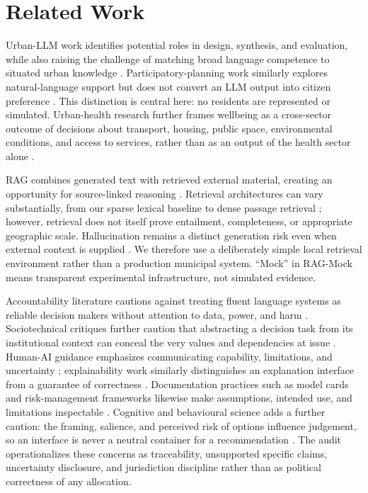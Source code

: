 \documentclass[sigconf,anonymous]{acmart}
\begin{document}
\section{Related Work}
Urban-LLM work identifies potential roles in design, synthesis, and evaluation, while also raising the challenge of matching broad language competence to situated urban knowledge \cite{zheng2025urban}. Participatory-planning work similarly explores natural-language support but does not convert an LLM output into citizen preference \cite{zhou2024participatory}. This distinction is central here: no residents are represented or simulated. Urban-health research further frames wellbeing as a cross-sector outcome of decisions about transport, housing, public space, environmental conditions, and access to services, rather than as an output of the health sector alone \cite{who2016urban,who2023urbangovernance}.

RAG combines generated text with retrieved external material, creating an opportunity for source-linked reasoning \cite{lewis2020rag}. Retrieval architectures can vary substantially, from our sparse lexical baseline to dense passage retrieval \cite{karpukhin2020dpr}; however, retrieval does not itself prove entailment, completeness, or appropriate geographic scale. Hallucination remains a distinct generation risk even when external context is supplied \cite{ji2023hallucination}. We therefore use a deliberately simple local retrieval environment rather than a production municipal system. ``Mock'' in RAG-Mock means transparent experimental infrastructure, not simulated evidence.

Accountability literature cautions against treating fluent language systems as reliable decision makers without attention to data, power, and harm \cite{bender2021stochastic,raji2020closing}. Sociotechnical critiques further caution that abstracting a decision task from its institutional context can conceal the very values and dependencies at issue \cite{selbst2019fairness}. Human-AI guidance emphasizes communicating capability, limitations, and uncertainty \cite{amershi2019guidelines}; explainability work similarly distinguishes an explanation interface from a guarantee of correctness \cite{gunning2019xai}. Documentation practices such as model cards and risk-management frameworks likewise make assumptions, intended use, and limitations inspectable \cite{mitchell2019model,nist2023airmf}. Cognitive and behavioural science adds a further caution: the framing, salience, and perceived risk of options influence judgement, so an interface is never a neutral container for a recommendation \cite{slovic1987risk,thaler2008nudge}. The audit operationalizes these concerns as traceability, unsupported specific claims, uncertainty disclosure, and jurisdiction discipline rather than as political correctness of any allocation.
\end{document}
